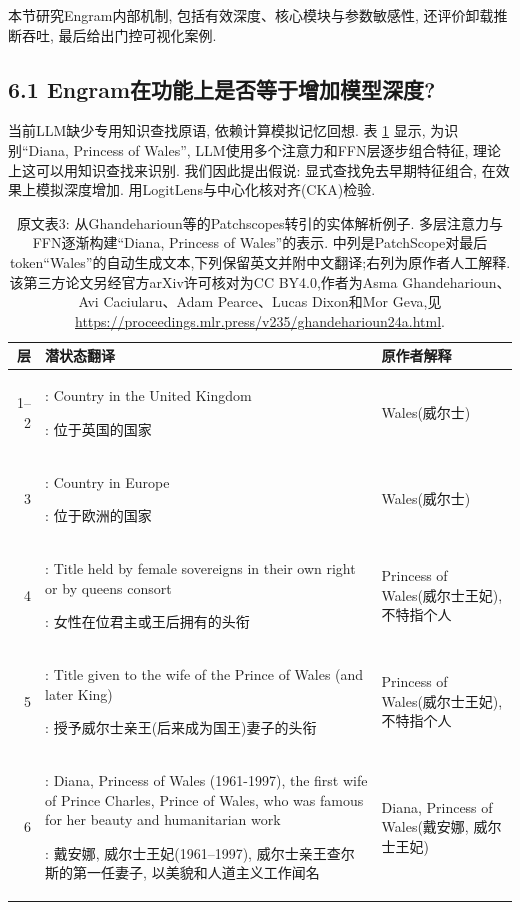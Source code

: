 本节研究Engram内部机制, 包括有效深度、核心模块与参数敏感性, 还评价卸载推断吞吐, 最后给出门控可视化案例.

\subsection*{6.1 Engram在功能上是否等于增加模型深度?}
当前LLM缺少专用知识查找原语, 依赖计算模拟记忆回想. 表 \ref{engram-tab-3} 显示, 为识别“Diana, Princess of Wales”, LLM使用多个注意力和FFN层逐步组合特征\cite{engram-li2025echoesbertmodernlanguage,engram-ghandeharioun2024patchscopes,engram-DBLP:conf/coling/JinYHZWH0MMDYDZ25}, 理论上这可以用知识查找来识别. 我们因此提出假说: 显式查找免去早期特征组合, 在效果上模拟深度增加. 用LogitLens\cite{engram-nostalgebraist2020logitlens,engram-belrose2023eliciting}与中心化核对齐(CKA)\cite{engram-kornblith2019similarity,engram-davari2022reliability}检验.

\begin{table}[htbp]
\centering\begingroup\setlength{\tabcolsep}{3pt}
\caption{原文表3: 从Ghandeharioun等的Patchscopes\cite{engram-ghandeharioun2024patchscopes}转引的实体解析例子. 多层注意力与FFN逐渐构建“Diana, Princess of Wales”的表示. 中列是PatchScope对最后token“Wales”的自动生成文本,下列保留英文并附中文翻译;右列为原作者人工解释. 该第三方论文另经官方arXiv许可核对为CC BY4.0,作者为Asma Ghandeharioun、Avi Caciularu、Adam Pearce、Lucas Dixon和Mor Geva,见\url{https://proceedings.mlr.press/v235/ghandeharioun24a.html}.}\label{engram-tab-3}
\begin{tabular}{rp{}p{}}\toprule
层 & 潜状态翻译 & 原作者解释\\\midrule
1--2 & : Country in the United Kingdom\par : 位于英国的国家 & Wales(威尔士)\\
3 & : Country in Europe\par : 位于欧洲的国家 & Wales(威尔士)\\
4 & : Title held by female sovereigns in their own right or by queens consort\par : 女性在位君主或王后拥有的头衔 & Princess of Wales(威尔士王妃), 不特指个人\\
5 & : Title given to the wife of the Prince of Wales (and later King)\par : 授予威尔士亲王(后来成为国王)妻子的头衔 & Princess of Wales(威尔士王妃), 不特指个人\\
6 & : Diana, Princess of Wales (1961-1997), the first wife of Prince Charles, Prince of Wales, who was famous for her beauty and humanitarian work\par : 戴安娜, 威尔士王妃(1961--1997), 威尔士亲王查尔斯的第一任妻子, 以美貌和人道主义工作闻名 & Diana, Princess of Wales(戴安娜, 威尔士王妃)\\\bottomrule
\end{tabular}\endgroup
\end{table}

